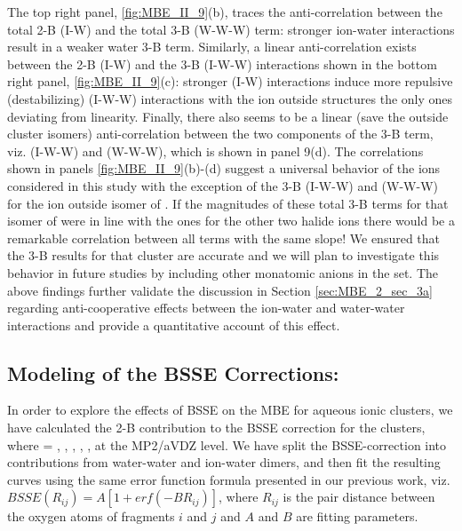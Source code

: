 \documentclass[11pt, proquest]{uwthesis}[2020/02/24]
\let\ce\ch
\begin{document}
\par The top right panel, \ref{fig:MBE_II_9}(b), traces the anti-correlation between the total 2-B (I-W) and the total 3-B (W-W-W) term: stronger ion-water interactions result in a weaker water 3-B term. Similarly, a linear anti-correlation exists between the 2-B (I-W) and the 3-B (I-W-W) interactions shown in the bottom right panel, \ref{fig:MBE_II_9}(c): stronger (I-W) interactions induce more repulsive (destabilizing) (I-W-W) interactions with the \ce{X^-} ion outside structures the only ones deviating from linearity. Finally, there also seems to be a linear (save the \ce{X^-} outside cluster isomers) anti-correlation between the two components of the 3-B term, viz. (I-W-W) and (W-W-W), which is shown in panel 9(d). The correlations shown in panels \ref{fig:MBE_II_9}(b)-(d) suggest a universal behavior of the ions considered in this study with the exception of the 3-B (I-W-W) and (W-W-W) for the ion outside isomer of \ce{Cl^-}. If the magnitudes of these total 3-B terms for that isomer of \ce{Cl^-} were in line with the ones for the other two halide ions there would be a remarkable correlation between all terms with the same slope! We ensured that the 3-B results for that cluster are accurate and we will plan to investigate this behavior in future studies by including other monatomic anions in the set. The above findings further validate the discussion in Section \ref{sec:MBE_2_sec_3a} regarding anti-cooperative effects between the ion-water and water-water interactions and provide a quantitative account of this effect.

\subsection{\textbf{Modeling of the BSSE Corrections:}}
\par In order to explore the effects of BSSE on the MBE for aqueous ionic clusters, we have calculated the 2-B contribution to the BSSE correction for the \ce{Z^{+/-}(H2O)9} clusters, where \ce{Z} = \ce{Li^+}, \ce{K^+}, \ce{Cs^+}, \ce{Cl^-}, \ce{Br^-}, \ce{I^-} at the MP2/aVDZ level. We have split the BSSE-correction into contributions from water-water and ion-water dimers, and then fit the resulting curves using the same error function formula presented in our previous work, viz. $BSSE(R_{ij})=A[1+erf(-BR_{ij})]$, where $R_{ij}$ is the pair distance between the oxygen atoms of fragments $i$ and $j$ and $A$ and $B$ are fitting parameters.
\end{document}
